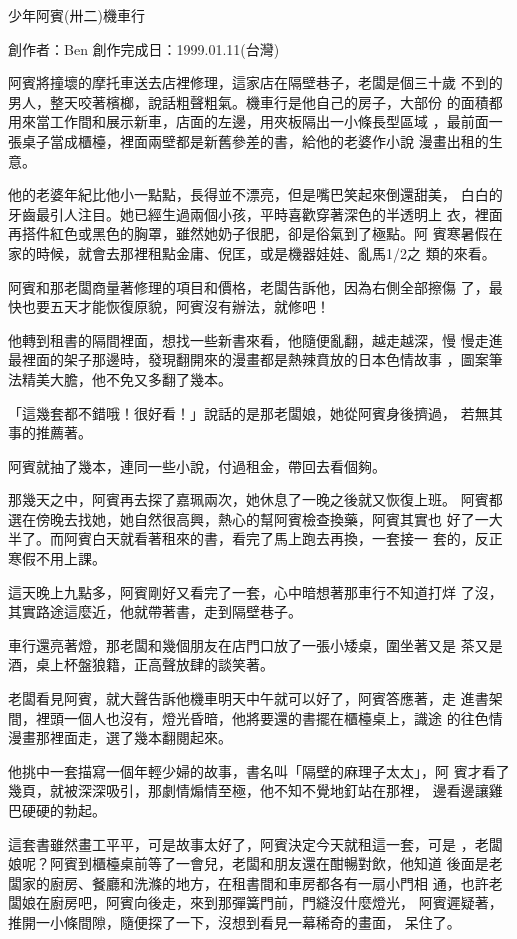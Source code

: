 



少年阿賓(卅二)機車行

創作者：Ben
創作完成日：1999.01.11(台灣)


阿賓將撞壞的摩托車送去店裡修理，這家店在隔壁巷子，老闆是個三十歲
不到的男人，整天咬著檳榔，說話粗聲粗氣。機車行是他自己的房子，大部份
的面積都用來當工作間和展示新車，店面的左邊，用夾板隔出一小條長型區域
，最前面一張桌子當成櫃檯，裡面兩壁都是新舊參差的書，給他的老婆作小說
漫畫出租的生意。

他的老婆年紀比他小一點點，長得並不漂亮，但是嘴巴笑起來倒還甜美，
白白的牙齒最引人注目。她已經生過兩個小孩，平時喜歡穿著深色的半透明上
衣，裡面再搭件紅色或黑色的胸罩，雖然她奶子很肥，卻是俗氣到了極點。阿
賓寒暑假在家的時候，就會去那裡租點金庸、倪匡，或是機器娃娃、亂馬1/2之
類的來看。

阿賓和那老闆商量著修理的項目和價格，老闆告訴他，因為右側全部擦傷
了，最快也要五天才能恢復原貌，阿賓沒有辦法，就修吧！

他轉到租書的隔間裡面，想找一些新書來看，他隨便亂翻，越走越深，慢
慢走進最裡面的架子那邊時，發現翻開來的漫畫都是熱辣賁放的日本色情故事
，圖案筆法精美大膽，他不免又多翻了幾本。

「這幾套都不錯哦！很好看！」說話的是那老闆娘，她從阿賓身後擠過，
若無其事的推薦著。

阿賓就抽了幾本，連同一些小說，付過租金，帶回去看個夠。

那幾天之中，阿賓再去探了嘉珮兩次，她休息了一晚之後就又恢復上班。
阿賓都選在傍晚去找她，她自然很高興，熱心的幫阿賓檢查換藥，阿賓其實也
好了一大半了。而阿賓白天就看著租來的書，看完了馬上跑去再換，一套接一
套的，反正寒假不用上課。

這天晚上九點多，阿賓剛好又看完了一套，心中暗想著那車行不知道打烊
了沒，其實路途這麼近，他就帶著書，走到隔壁巷子。

車行還亮著燈，那老闆和幾個朋友在店門口放了一張小矮桌，圍坐著又是
茶又是酒，桌上杯盤狼籍，正高聲放肆的談笑著。

老闆看見阿賓，就大聲告訴他機車明天中午就可以好了，阿賓答應著，走
進書架間，裡頭一個人也沒有，燈光昏暗，他將要還的書擺在櫃檯桌上，識途
的往色情漫畫那裡面走，選了幾本翻閱起來。

他挑中一套描寫一個年輕少婦的故事，書名叫「隔壁的麻理子太太」，阿
賓才看了幾頁，就被深深吸引，那劇情煽情至極，他不知不覺地釘站在那裡，
邊看邊讓雞巴硬硬的勃起。

這套書雖然畫工平平，可是故事太好了，阿賓決定今天就租這一套，可是
，老闆娘呢？阿賓到櫃檯桌前等了一會兒，老闆和朋友還在酣暢對飲，他知道
後面是老闆家的廚房、餐廳和洗滌的地方，在租書間和車房都各有一扇小門相
通，也許老闆娘在廚房吧，阿賓向後走，來到那彈簧門前，門縫沒什麼燈光，
阿賓遲疑著，推開一小條間隙，隨便探了一下，沒想到看見一幕稀奇的畫面，
呆住了。

